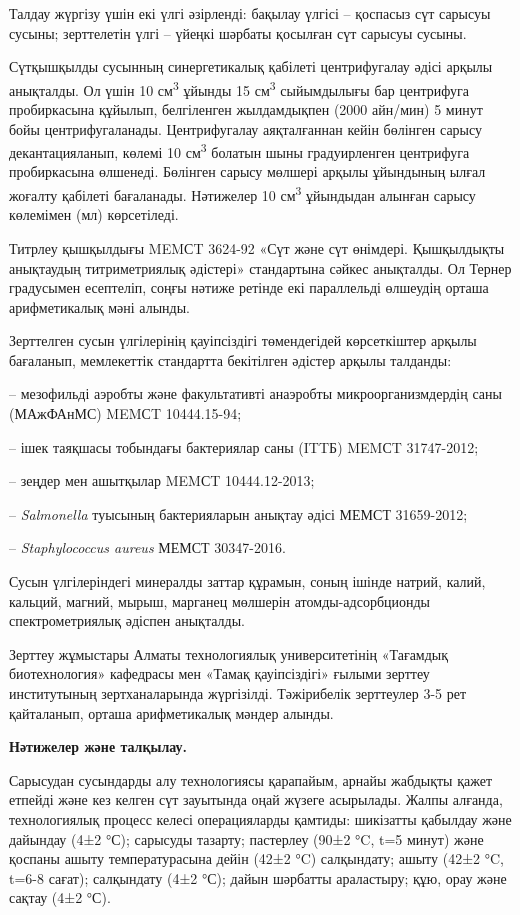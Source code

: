 \begin{multicols}{2}
Талдау жүргізу үшін екі үлгі әзірленді: бақылау үлгісі -- қоспасыз сүт
сарысуы сусыны; зерттелетін үлгі -- үйеңкі шәрбаты қосылған сүт сарысуы
сусыны.

Сүтқышқылды сусынның синергетикалық қабілеті центрифугалау әдісі арқылы
анықталды. Ол үшін 10 см\textsuperscript{3} ұйынды 15
см\textsuperscript{3} сыйымдылығы бар центрифуга пробиркасына құйылып,
белгіленген жылдамдықпен (2000 айн/мин) 5 минут бойы центрифугаланады.
Центрифугалау аяқталғаннан кейін бөлінген сарысу декантацияланып, көлемі
10 см\textsuperscript{3} болатын шыны градуирленген центрифуга
пробиркасына өлшенеді. Бөлінген сарысу мөлшері арқылы ұйындының ылғал
жоғалту қабілеті бағаланады. Нәтижелер 10 см\textsuperscript{3}
ұйындыдан алынған сарысу көлемімен (мл) көрсетіледі.

Титрлеу қышқылдығы MEMСT 3624-92 «Сүт және сүт өнімдері. Қышқылдықты
анықтаудың титриметриялық әдістері» стандартына сәйкес анықталды. Ол
Тернер градусымен есептеліп, соңғы нәтиже ретінде екі параллельді
өлшеудің орташа арифметикалық мәні алынды.

Зерттелген сусын үлгілерінің қауіпсіздігі төмендегідей көрсеткіштер
арқылы бағаланып, мемлекеттік стандартта бекітілген әдістер арқылы
талданды:

-- мезофильді аэробты және факультативті анаэробты микроорганизмдердің
саны (МАжФАнМС) MEMСT 10444.15-94;

-- ішек таяқшасы тобындағы бактериялар саны (ITTБ) MEMСT 31747-2012;

-- зеңдер мен ашытқылар MEMСT 10444.12-2013;

-- \emph{Salmonella} туысының бактерияларын анықтау әдісі МЕМСТ 31659-2012;

-- \emph{Staphylococcus aureus} МЕМСТ 30347-2016.

Сусын үлгілеріндегі минералды заттар құрамын, соның ішінде натрий,
калий, кальций, магний, мырыш, марганец мөлшерін атомды-адсорбционды
спектрометриялық әдіспен анықталды.

Зерттеу жұмыстары Алматы технологиялық университетінің «Тағамдық
биотехнология» кафедрасы мен «Тамақ қауіпсіздігі» ғылыми зерттеу
институтының зертханаларында жүргізілді. Тәжірибелік зерттеулер 3-5 рет
қайталанып, орташа арифметикалық мәндер алынды.

{\bfseries Нәтижелер және талқылау.}

Сарысудан сусындарды алу технологиясы қарапайым, арнайы жабдықты қажет
етпейді және кез келген сүт зауытында оңай жүзеге асырылады. Жалпы
алғанда, технологиялық процесс келесі операцияларды қамтиды: шикізатты
қабылдау және дайындау (4±2 °С); сарысуды тазарту; пастерлеу (90±2 °C,
t=5 минут) және қоспаны ашыту температурасына дейін (42±2 °C)
салқындату; ашыту (42±2 °C, t=6-8 сағат); салқындату (4±2 °С); дайын
шәрбатты араластыру; құю, орау және сақтау (4±2 °С).


\end{multicols}
